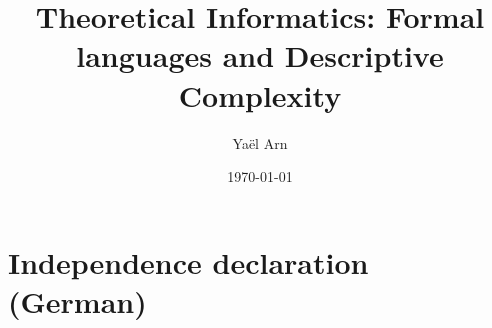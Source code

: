 \documentclass[a4paper,11pt]{report}
\title %
{Theoretical Informatics: Formal languages and Descriptive Complexity}
\date{\today}   %
\author{Yaël Arn}  %
\theoremstyle{definition}
\theoremstyle{definition}
\begin{document}


\onehalfspacing %



\newpage
{}
\tableofcontents %
\newpage %

\renewcommand{\chaptermark}[1]{\markboth{\MakeUppercase{\thechapter.\ #1}}{}} %
\renewcommand{\sectionmark}[1]{\markright{\thesection.\ #1}{}} %
\fancyhead[R]{\rightmark}
\fancyhead[L]{\leftmark}
\fancyhead[L]{\leftmark}
\fancyhead[R]{\rightmark}
\pagestyle{fancy}







\cleardoublepage %
\nocite{*}
\printbibliography %


\appendix





\chapter{Independence declaration (German)}\label{ch:appendix_independencedeclaration}



\end{document}
